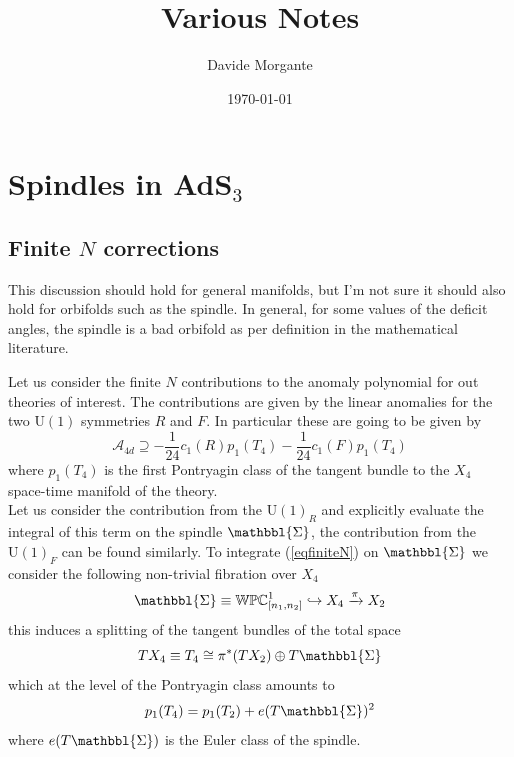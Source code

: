 \documentclass[11pt]{article}
\title{\vspace{1cm}\bf{Various Notes}\vspace{0.2cm}}
\date{\vspace{0.2cm} \today}
\author{Davide Morgante}
\theoremstyle{definition}
\numberwithin{equation}{section}
\newcommand{\Spindle}{\mathbbl{\Sigma}}
\newcommand*\U{\mathrm{U}}
\begin{document}
\allowdisplaybreaks
\maketitle

\setcounter{page}{1}
{\hypersetup{linkcolor=orange}
\tableofcontents
}

\section{\texorpdfstring{Spindles in AdS$_3$}{Spindles}}
\subsection{\texorpdfstring{Finite $N$ corrections}{Finite N}}
This discussion should hold for general manifolds, but I'm not sure it should also hold for orbifolds such as the spindle. In general, for some values of the deficit angles, the spindle is a bad orbifold as per definition in the mathematical literature.

Let us consider the finite $N$ contributions to the anomaly polynomial for out theories of interest. The contributions are given by the linear anomalies for the two $\U(1)$ symmetries $R$ and $F$. In particular these are going to be given by
\begin{equation}
	\mathcal{A}_{4d}\supseteq -\frac{1}{24}c_{1}(R)p_{1}(T_{4})-\frac{1}{24}c_{1}(F)p_{1}(T_{4}) 
	\label{eqfiniteN}
\end{equation}
where $p_{1}(T_{4})$ is the first Pontryagin class of the tangent bundle to the $X_{4}$ space-time manifold of the theory.\\
Let us consider the contribution from the $\U(1)_{R}$ and explicitly evaluate the integral of this term on the spindle $\Spindle$, the contribution from the $\U(1)_{F}$ can be found similarly. To integrate (\ref{eqfiniteN}) on $\Spindle$ we consider the following non-trivial fibration over $X_{4}$ 
\begin{equation}
	\Spindle\equiv\mathbb{WPC}^{1}_{[n_{1},n_{2}]}\hookrightarrow X_{4}\xrightarrow{\pi} X_{2}
\end{equation}
this induces a splitting of the tangent bundles of the total space 
\begin{equation}
	TX_{4}\equiv T_{4}\cong \pi^{*}(TX_{2})\oplus T\Spindle
\end{equation}
which at the level of the Pontryagin class amounts to
\begin{equation}
	p_{1}(T_{4})=p_{1}(T_{2})+e(T\Spindle)^{2}
	\label{eqpontry}
\end{equation}
where $e(T\Spindle)$ is the Euler class of the spindle.
\end{document}
